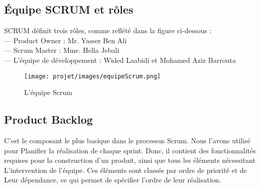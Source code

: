 \subsection{Équipe SCRUM et rôles}
SCRUM définit trois rôles, comme reflété dans la figure ci-dessous :\\
— Product Owner : Mr. Yasser Ben Ali\\
— Scrum Master : Mme. Hella Jebali\\
— L’équipe de développement : Wided Laabidi et Mohamed Aziz Barrouta

\begin{figure}[H]
    \centering
    \texttt{[image: projet/images/equipeScrum.png]}
    \caption{L'équipe Scrum}
    \label{fig:equipe_scrum}
\end{figure}

\subsection{Product Backlog}
C'est le composant le plus basique dans le processus Scrum. Nous l’avons utilisé pour
Planifier la réalisation de chaque sprint. Donc, il contient des fonctionnalités
requises pour la construction d’un produit, ainsi que tous les éléments nécessitant
L’intervention de l’équipe. Ces éléments sont classés par ordre de priorité et de
Leur dépendance, ce qui permet de spécifier l’ordre de leur réalisation.\\


